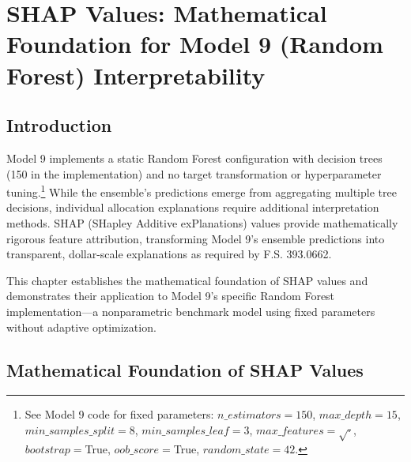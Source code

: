 
\chapter{SHAP Values: Mathematical Foundation for Model 9 (Random Forest) Interpretability}\label{ch:shap_values}


\section{Introduction}
Model 9 implements a static Random Forest configuration with \ModelNineNTrees{} decision trees (150 in the implementation) and no target transformation or hyperparameter tuning.\footnote{See Model 9 code for fixed parameters: $n\_estimators=150$, $max\_depth=15$, $min\_samples\_split=8$, $min\_samples\_leaf=3$, $max\_features=\sqrt{\cdot}$, $bootstrap{=}$True, $oob\_score{=}$True, $random\_state{=}42$.} While the ensemble's predictions emerge from aggregating multiple tree decisions, individual allocation explanations require additional interpretation methods. SHAP (SHapley Additive exPlanations) values provide mathematically rigorous feature attribution, transforming Model 9's ensemble predictions into transparent, dollar-scale explanations as required by F.S. 393.0662. 

This chapter establishes the mathematical foundation of SHAP values and demonstrates their application to Model 9's specific Random Forest implementation—a nonparametric benchmark model using fixed parameters without adaptive optimization.

\section{Mathematical Foundation of SHAP Values}

